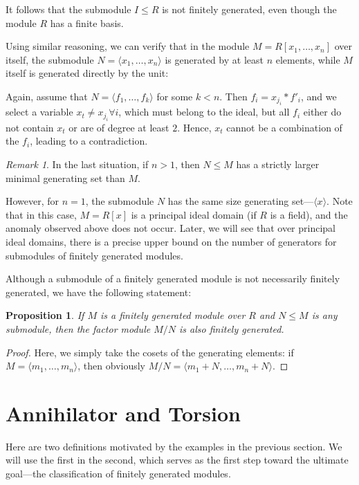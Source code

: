 \documentclass{article}
\newif\ifusemulticols
\theoremstyle{definition}
\theoremstyle{remark}
\newtheorem*{note}{Remark}
\theoremstyle{plain}
\theoremstyle{plain}
\newtheorem{prop}[theorem]{Proposition}
\newenvironment{mymulticols}
    { \ifusemulticols \begin{multicols}{2} \fi }
    { \ifusemulticols \end{multicols} \fi }
\begin{document}
\begin{mymulticols}
\begin{enumerate}
        It follows that the submodule $I \le R$ is not finitely generated, even though the module $R$ has a finite basis.

        Using similar reasoning, we can verify that in the module $M = R[x_1, \dots, x_n]$ over
        itself, the submodule $N = \langle x_1, \dots, x_n \rangle$ is generated by at least $n$
        elements, while $M$ itself is generated directly by the unit:

        Again, assume that $N = \langle f_1, \dots, f_k \rangle$ for some $k < n$. Then $f_i =
        x_{j_i} * f'_i$, and we select a variable $x_t \not= x_{j_i} \forall i$, which must belong
        to the ideal, but all $f_i$ either do not contain $x_t$ or are of degree at least $2$.
        Hence, $x_t$ cannot be a combination of the $f_i$, leading to a contradiction.

        \begin{note}
            In the last situation, if $n > 1$, then $N \le M$ has a strictly larger minimal
            generating set than $M$.

            However, for $n = 1$, the submodule $N$ has the same size generating set—$\langle x
            \rangle$.
            Note that in this case, $M = R[x]$ is a principal ideal domain (if $R$ is a field), and
            the anomaly observed above does not occur. Later, we will see that over principal ideal
            domains, there is a precise upper bound on the number of generators for submodules of
            finitely generated modules.
        \end{note}
\end{enumerate}

Although a submodule of a finitely generated module is not necessarily finitely generated, we have
the following statement:
\begin{prop}
    If $M$ is a finitely generated module over $R$ and $N \le M$ is any submodule, then the factor
    module $M / N$ is also finitely generated.
\end{prop}

\begin{proof}
    Here, we simply take the cosets of the generating elements: if $M = \langle m_1, \dots, m_n
    \rangle$, then obviously $M/N = \langle m_1 + N, \dots, m_n + N \rangle$.
\end{proof}

\section{Annihilator and Torsion}
Here are two definitions motivated by the examples in the previous section. We will use the first in
the second, which serves as the first step toward the ultimate goal—the classification of finitely generated modules.


\end{mymulticols}
\end{document}
